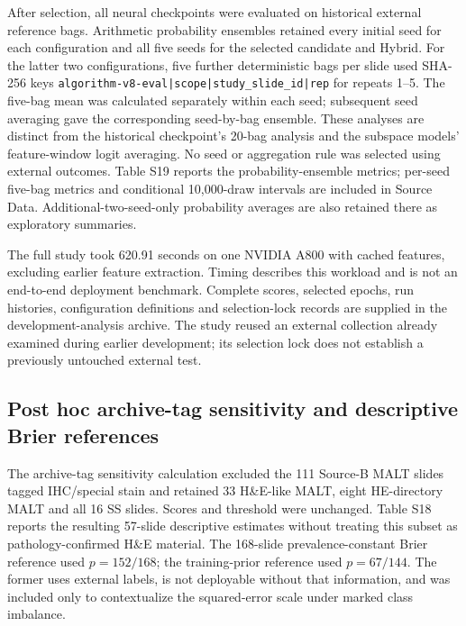 After selection, all neural checkpoints were evaluated on historical external reference bags. Arithmetic probability ensembles retained every initial seed for each configuration and all five seeds for the selected candidate and Hybrid. For the latter two configurations, five further deterministic bags per slide used SHA-256 keys \texttt{algorithm-v8-eval|scope|study\_slide\_id|rep} for repeats 1--5. The five-bag mean was calculated separately within each seed; subsequent seed averaging gave the corresponding seed-by-bag ensemble. These analyses are distinct from the historical checkpoint's 20-bag analysis and the subspace models' feature-window logit averaging. No seed or aggregation rule was selected using external outcomes. Table S19 reports the probability-ensemble metrics; per-seed five-bag metrics and conditional 10,000-draw intervals are included in Source Data. Additional-two-seed-only probability averages are also retained there as exploratory summaries.

The full study took 620.91 seconds on one NVIDIA A800 with cached features, excluding earlier feature extraction. Timing describes this workload and is not an end-to-end deployment benchmark. Complete scores, selected epochs, run histories, configuration definitions and selection-lock records are supplied in the development-analysis archive. The study reused an external collection already examined during earlier development; its selection lock does not establish a previously untouched external test.

\subsection{Post hoc archive-tag sensitivity and descriptive Brier references}

The archive-tag sensitivity calculation excluded the 111 Source-B MALT slides tagged IHC/special stain and retained 33 H\&E-like MALT, eight HE-directory MALT and all 16 SS slides. Scores and threshold were unchanged. Table S18 reports the resulting 57-slide descriptive estimates without treating this subset as pathology-confirmed H\&E material. The 168-slide prevalence-constant Brier reference used $p=152/168$; the training-prior reference used $p=67/144$. The former uses external labels, is not deployable without that information, and was included only to contextualize the squared-error scale under marked class imbalance.
